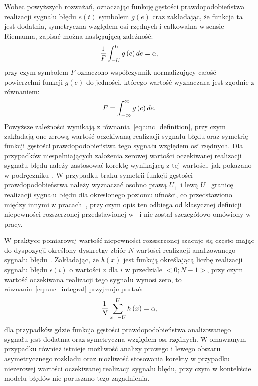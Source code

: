 Wobec powyższych rozważań, oznaczając funkcję gęstości prawdopodobieństwa realizacji sygnału błędu $e(t)$ symbolem $g(e)$ oraz zakładając, że funkcja ta jest dodatnia, symetryczna względem osi rzędnych i całkowalna w sensie Riemanna, zapisać można następującą zależność:
\begin{equation}
\frac{1}{F} \int _{-U} ^{U} g \left(e\right) de = \alpha \label{eq:unc_integral},
\end{equation}
przy czym symbolem $F$ oznaczono współczynnik normalizujący całość powierzchni funkcji $g(e)$ do jedności, którego wartość wyznaczana jest zgodnie z równaniem:
\begin{equation}
F = \int _{-\infty} ^{\infty} g \left(e\right) de \label{eq:unc_normalizer_int}.
\end{equation}
Powyższe zależności wynikają z równania~\eqref{eq:unc_definition}, przy czym zakładają one zerową wartość oczekiwaną realizacji sygnału błędu oraz symetrię funkcji gęstości prawdopodobieństwa tego sygnału względem osi rzędnych. Dla przypadków niespełniających założenia zerowej wartości oczekiwanej realizacji sygnału błędu należy zastosować korektę wynikającą z tej wartości, jak pokazano w podręczniku~\cite{jakubiec_system}. W przypadku braku symetrii funkcji gęstości prawdopodobieństwa należy wyznaczać osobno prawą $U_{+}$ i lewą $U_{-}$ granicę realizacji sygnału błędu dla określonego poziomu ufności, co przedstawiono między innymi w pracach~\cite{roj_annuncertainty, wymyslo_range}, przy czym opis ten odbiega od klasycznej definicji niepewności rozszerzonej przedstawionej w~\cite{jcgm_guide} i nie został szczegółowo omówiony w pracy.

W praktyce pomiarowej wartość niepewności rozszerzonej szacuje się często mając do dyspozycji określony dyskretny zbiór $N$ wartości realizacji analizowanego sygnału błędu~\cite{jcgm_guide}. Zakładając, że $h(x)$ jest funkcją określającą liczbę realizacji sygnału błędu $e(i)$ o wartości $x$ dla $i$ w przedziale  $<0;N-1>$, przy czym wartość oczekiwana realizacji tego sygnału wynosi zero, to równanie~\eqref{eq:unc_integral} przyjmuje postać:
\begin{equation}
\frac{1}{N} \sum _{x=-U} ^{U} h \left(x\right) = \alpha \label{eq:unc_summation},
\end{equation}
dla przypadków gdzie funkcja gęstości prawdopodobieństwa analizowanego sygnału jest dodatnia oraz symetryczna względem osi rzędnych. W omawianym przypadku również istnieje możliwość analizy prawego i lewego obszaru asymetrycznego rozkładu oraz możliwość stosowania korekty w przypadku niezerowej wartości oczekiwanej realizacji sygnału błędu, przy czym w kontekście modelu błędów nie poruszano tego zagadnienia.

